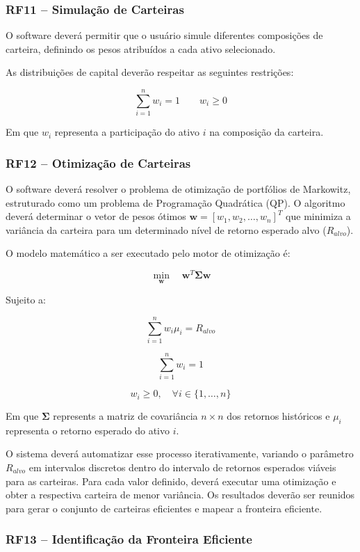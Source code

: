 \subsubsection{RF11 -- Simulação de Carteiras}

O software deverá permitir que o usuário simule diferentes
composições de carteira, definindo os pesos atribuídos a
cada ativo selecionado.

As distribuições de capital deverão respeitar as seguintes
restrições:

\[
\sum_{i=1}^{n} w_i = 1
\qquad
w_i \geq 0
\]

Em que $w_i$ representa a participação do ativo $i$ na
composição da carteira.

\subsubsection{RF12 -- Otimização de Carteiras}

O software deverá resolver o problema de otimização de portfólios de Markowitz, estruturado como um problema de Programação Quadrática (QP). O algoritmo deverá determinar o vetor de pesos ótimos \(\mathbf{w} = [w_1, w_2, \dots, w_n]^T\) que minimiza a variância da carteira para um determinado nível de retorno esperado alvo (\(R_{alvo}\)).

O modelo matemático a ser executado pelo motor de otimização é:

\[
\min_{\mathbf{w}} \quad \mathbf{w}^T \mathbf{\Sigma} \mathbf{w}
\]

Sujeito a:

\[
\sum_{i=1}^{n} w_i \mu_i = R_{alvo}
\]

\[
\sum_{i=1}^{n} w_i = 1
\]

\[
w_i \geq 0, \quad \forall i \in \{1, \dots, n\}
\]

Em que \(\mathbf{\Sigma}\) represents a matriz de covariância \(n \times n\) dos retornos históricos e \(\mu_i\) representa o retorno esperado do ativo \(i\).

O sistema deverá automatizar esse processo iterativamente, variando o parâmetro \(R_{alvo}\) em intervalos discretos dentro do intervalo de retornos esperados viáveis para as carteiras. Para cada valor definido, deverá executar uma otimização e obter a respectiva carteira de menor variância. Os resultados deverão ser reunidos para gerar o conjunto de carteiras eficientes e mapear a fronteira eficiente.

\subsubsection{RF13 -- Identificação da Fronteira Eficiente}

